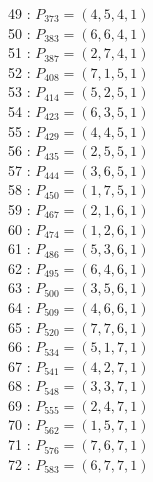 \documentclass{article}
\begin{document}
{\begin{multicols}{3}
49 : $P_{373}=( 4, 5, 4, 1 )$\\
50 : $P_{383}=( 6, 6, 4, 1 )$\\
51 : $P_{387}=( 2, 7, 4, 1 )$\\
52 : $P_{408}=( 7, 1, 5, 1 )$\\
53 : $P_{414}=( 5, 2, 5, 1 )$\\
54 : $P_{423}=( 6, 3, 5, 1 )$\\
55 : $P_{429}=( 4, 4, 5, 1 )$\\
56 : $P_{435}=( 2, 5, 5, 1 )$\\
57 : $P_{444}=( 3, 6, 5, 1 )$\\
58 : $P_{450}=( 1, 7, 5, 1 )$\\
59 : $P_{467}=( 2, 1, 6, 1 )$\\
60 : $P_{474}=( 1, 2, 6, 1 )$\\
61 : $P_{486}=( 5, 3, 6, 1 )$\\
62 : $P_{495}=( 6, 4, 6, 1 )$\\
63 : $P_{500}=( 3, 5, 6, 1 )$\\
64 : $P_{509}=( 4, 6, 6, 1 )$\\
65 : $P_{520}=( 7, 7, 6, 1 )$\\
66 : $P_{534}=( 5, 1, 7, 1 )$\\
67 : $P_{541}=( 4, 2, 7, 1 )$\\
68 : $P_{548}=( 3, 3, 7, 1 )$\\
69 : $P_{555}=( 2, 4, 7, 1 )$\\
70 : $P_{562}=( 1, 5, 7, 1 )$\\
71 : $P_{576}=( 7, 6, 7, 1 )$\\
72 : $P_{583}=( 6, 7, 7, 1 )$\\
\end{multicols}


%


%


}%
\end{document}
